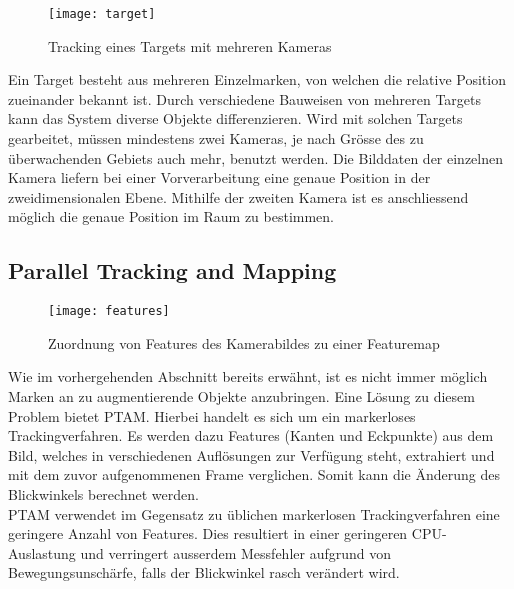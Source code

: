 \begin{wrapfigure}{l}{0.35\textwidth}
	\vspace{-30pt}
	\begin{center}
		\texttt{[image: target]}
	\end{center}
	\vspace{-15pt}
	\captionsetup{width=0.3\textwidth}
	\caption{Tracking eines Targets mit mehreren Kameras}\label{target}
	\vspace{-12pt}
\end{wrapfigure}
Ein Target besteht aus mehreren Einzelmarken, von welchen die relative Position zueinander bekannt ist. Durch verschiedene Bauweisen von mehreren Targets kann das System diverse Objekte differenzieren. Wird mit solchen Targets gearbeitet, müssen mindestens zwei Kameras, je nach Grösse des zu überwachenden Gebiets auch mehr, benutzt werden. Die Bilddaten der einzelnen Kamera liefern bei einer Vorverarbeitung eine genaue Position in der zweidimensionalen Ebene. Mithilfe der zweiten Kamera ist es anschliessend möglich die genaue Position im Raum zu bestimmen.\cite[S.~106~ff.]{doerner13}
\newpage
\subsection*{Parallel Tracking and Mapping}
\begin{wrapfigure}{r}{0.35\textwidth}
	\vspace{-30pt}
	\begin{center}
		\texttt{[image: features]}
	\end{center}
	\vspace{-15pt}
	\captionsetup{width=0.28\textwidth}
	\caption{Zuordnung von Features des Kamerabildes zu einer Featuremap}\label{features}
	\vspace{-20pt}
\end{wrapfigure}
Wie im vorhergehenden Abschnitt bereits erwähnt, ist es nicht immer möglich Marken an zu augmentierende Objekte anzubringen. Eine Lösung zu diesem Problem bietet PTAM. Hierbei handelt es sich um ein markerloses Trackingverfahren. Es werden dazu Features (Kanten und Eckpunkte) aus dem Bild, welches in verschiedenen Auflösungen zur Verfügung steht, extrahiert und mit dem zuvor aufgenommenen Frame verglichen. Somit kann die Änderung des Blickwinkels berechnet werden.\cite[S.~106~ff.]{doerner13}\\[6pt]
PTAM verwendet im Gegensatz zu üblichen markerlosen Trackingverfahren eine geringere Anzahl von Features. Dies resultiert in einer geringeren CPU-Auslastung und verringert ausserdem Messfehler aufgrund von Bewegungsunschärfe, falls der Blickwinkel rasch verändert wird.\cite{website:ptam}

